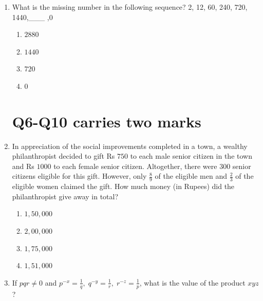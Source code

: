 \documentclass[journal,12pt,onecolumn]{IEEEtran}
\theoremstyle{remark}
\begin{document}
\begin{enumerate}
\hfill{}
\begin{multicols}{4}
\begin{enumerate}
\item $3047$
\item $6047$ 
\item $7987$
\item $63487$
\end{enumerate}
\end{multicols}
\item What is the missing number in the following sequence? 
2, 12, 60, 240, 720, 1440,\_\_\_  ,0

\hfill{} 
\begin{multicols}{4}
\begin{enumerate}
\item $2880$
\item $1440$
\item $720$
\item $0$
\end{enumerate}
\end{multicols}
\section*{Q6-Q10 carries two marks}
\item In appreciation of the social improvements completed in a town, a wealthy philanthropist decided to gift Rs $750$ to each male senior citizen in the town and Rs $1000$ to each female senior citizen. Altogether, there were $300$ senior citizens eligible for this gift. However, only $\tfrac{8}{9}$ of the eligible men and $\tfrac{2}{3}$ of the eligible women claimed the gift. How much money (in Rupees) did the philanthropist give away in total?  

\hfill{}
\begin{multicols}{4}
\begin{enumerate}
\item $1,50,000$
\item $2,00,000$ 
\item $1,75,000$
\item $1,51,000$
\end{enumerate}
\end{multicols}
\item If $pqr \ne 0$ and $p^{-x} = \frac{1}{q}, \; q^{-y} = \frac{1}{r}, \; r^{-z} = \frac{1}{p}$, what is the value of the product $xyz$?   


\end{enumerate}
\end{document}
